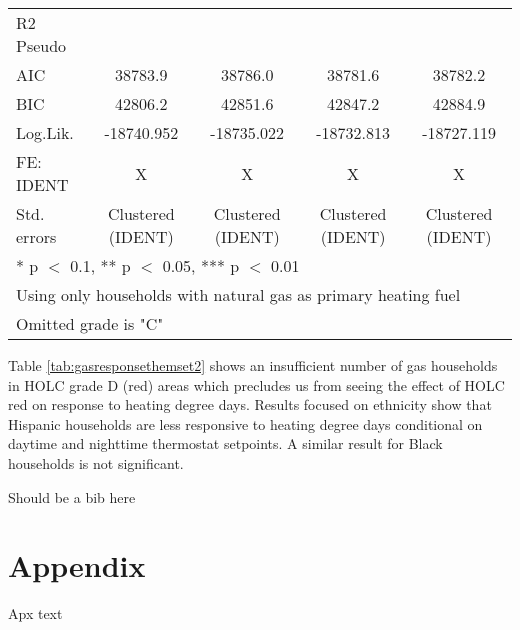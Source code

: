 \documentclass[
]{article}
\begin{document}
\begin{table}
{\begin{tabular}[t]{lcccc}
R2 Pseudo &  &  &  & \\
AIC & 38783.9 & 38786.0 & 38781.6 & 38782.2\\
BIC & 42806.2 & 42851.6 & 42847.2 & 42884.9\\
Log.Lik. & -18740.952 & -18735.022 & -18732.813 & -18727.119\\
FE: IDENT & X & X & X & X\\
Std. errors & Clustered (IDENT) & Clustered (IDENT) & Clustered (IDENT) & Clustered (IDENT)\\
\bottomrule
\multicolumn{5}{l}{\textsuperscript{} * p $<$ 0.1, ** p $<$ 0.05, *** p $<$ 0.01}\\
\multicolumn{5}{l}{\textsuperscript{} Using only households with natural gas as primary heating fuel}\\
\multicolumn{5}{l}{\textsuperscript{} Omitted grade is "C"}\\
\end{tabular}}
\end{table}

Table \ref{tab:gasresponsethemset2} shows an insufficient number of gas households in HOLC grade D (red) areas which precludes us from seeing the effect of HOLC red on response to heating degree days.
Results focused on ethnicity show that Hispanic households are less responsive to heating degree days conditional on daytime and nighttime
thermostat setpoints. A similar result for Black households is not significant.\cite{Reames2016} \cite{Baxter1998}

Should be a bib here
\printbibliography

\hypertarget{refs}{}

\hypertarget{appendix}{%
\section{Appendix}\label{appendix}}

\appendix

Apx text
\end{document}
